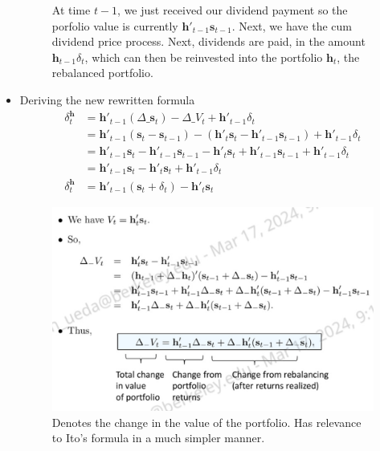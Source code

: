 \documentclass[11pt]{article}
\begin{document}
\begin{itemize}
\begin{figure}[H]
        \caption{At time $t-1$, we just received our dividend payment so the porfolio value is 
        currently $\boldsymbol{h}'_{t-1} \boldsymbol{s}_{t-1}$. Next, we have the cum dividend 
        price process. Next, dividends are paid, in the amount $\boldsymbol{h}_{t-1}\delta_t$, 
        which can then be reinvested into the portfolio $\boldsymbol{h}_{t}$, the rebalanced 
        portfolio.}
    \end{figure}

    \item Deriving the new rewritten formula  
    \begin{align*}
        \delta_t^{\boldsymbol{h}} 
        &= \boldsymbol{h}'_{t-1}(\Delta\_\boldsymbol{s}_t) - \Delta \_ V_t + 
        \boldsymbol{h}'_{t-1} \delta_t \\
        &= \boldsymbol{h}'_{t-1}(\boldsymbol{s}_t - \boldsymbol{s}_{t-1}) - 
        (\boldsymbol{h}'_{t}\boldsymbol{s}_{t} - \boldsymbol{h}'_{t-1}\boldsymbol{s}_{t-1}) + 
        \boldsymbol{h}'_{t-1} \delta_t \\
        &= \boldsymbol{h}'_{t-1}\boldsymbol{s}_t - \boldsymbol{h}'_{t-1}\boldsymbol{s}_{t-1} - 
        \boldsymbol{h}'_{t}\boldsymbol{s}_{t} + \boldsymbol{h}'_{t-1}\boldsymbol{s}_{t-1} + 
        \boldsymbol{h}'_{t-1} \delta_t \\
        &= \boldsymbol{h}'_{t-1}\boldsymbol{s}_t - \boldsymbol{h}'_{t}\boldsymbol{s}_{t} + 
        \boldsymbol{h}'_{t-1} \delta_t \\
        \delta_t^{\boldsymbol{h}} &= \boldsymbol{h}'_{t-1}(\boldsymbol{s}_t + \delta_t) - 
        \boldsymbol{h}'_{t}\boldsymbol{s}_t
    \end{align*}
    
    \begin{figure}[H] 
        \centering 
        \includegraphics[width=5in]{imgs/change_in_value_process.png}
        \caption{Denotes the change in the value of the portfolio. Has relevance to Ito's 
        formula in a much simpler manner.}
    \end{figure}
    

\end{itemize}
\end{document}
